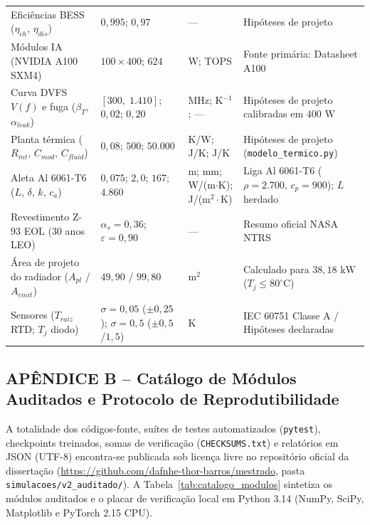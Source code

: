 \begin{table}[htbp]
\begin{tabularx}{\textwidth}{>{\raggedright\arraybackslash}p{3.5cm}>{\raggedright\arraybackslash}p{4.3cm}>{\raggedright\arraybackslash}p{1.6cm}>{\raggedright\arraybackslash}X}
Eficiências BESS ($\eta_{ch}$, $\eta_{dis}$) & $0{,}995$; $0{,}97$ & — & Hipóteses de projeto \\
Módulos IA (NVIDIA A100 SXM4) & $100 \times 400$; $624$ & W; TOPS & Fonte primária: Datasheet A100 \cite{nvidia_a100_datasheet} \\
Curva DVFS $V(f)$ e fuga ($\beta_T$, $\alpha_{leak}$) & $[300,\; 1.410]$; $0{,}02$; $0{,}20$ & MHz; K$^{-1}$; — & Hipóteses de projeto calibradas em $400\text{ W}$ \\
Planta térmica ($R_{int}$, $C_{mod}$, $C_{fluid}$) & $0{,}08$; $500$; $50.000$ & K/W; J/K; J/K & Hipóteses de projeto (\texttt{modelo\_termico.py}) \\
Aleta Al 6061-T6 ($L$, $\delta$, $k$, $c_a$) & $0{,}075$; $2{,}0$; $167$; $4.860$ & m; mm; W/(m$\cdot$K); J/(m$^2\cdot$K) & Liga Al 6061-T6 ($\rho=2.700$, $c_p=900$); $L$ herdado \\
Revestimento Z-93 EOL (30 anos LEO) & $\alpha_s = 0{,}36$; $\varepsilon = 0{,}90$ & — & Resumo oficial NASA NTRS \cite{hasegawa1992z93} \\
Área de projeto do radiador ($A_{pl}$ / $A_{emit}$) & $49{,}90$ / $99{,}80$ & m$^2$ & Calculado para $38{,}18\text{ kW}$ ($T_j \le 80^\circ\text{C}$) \\
Sensores ($T_{raiz}$ RTD; $T_j$ diodo) & $\sigma=0{,}05$ ($\pm 0{,}25$); $\sigma=0{,}5$ ($\pm 0{,}5$/$1{,}5$) & K & IEC 60751 Classe A / Hipóteses declaradas \\
\bottomrule
\end{tabularx}
\end{table}

\newpage
{}
\subsection*{APÊNDICE B -- Catálogo de Módulos Auditados e Protocolo de Reprodutibilidade}

A totalidade dos códigos-fonte, suítes de testes automatizados (\texttt{pytest}), checkpoints treinados, somas de verificação (\texttt{CHECKSUMS.txt}) e relatórios em JSON (UTF-8) encontra-se publicada sob licença livre no repositório oficial da dissertação (\url{https://github.com/dafnhe-thor-barros/mestrado}, pasta \texttt{simulacoes/v2\_auditado/}). A Tabela~\ref{tab:catalogo_modulos} sintetiza os módulos auditados e o placar de verificação local em Python 3.14 (NumPy, SciPy, Matplotlib e PyTorch 2.15 CPU).

